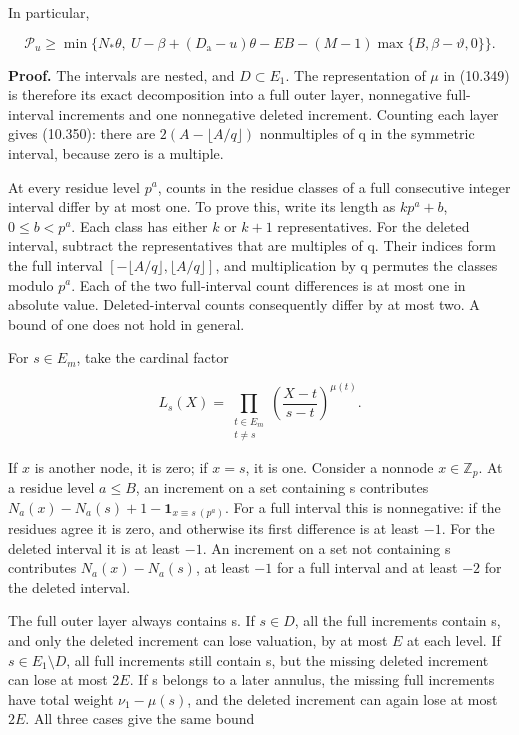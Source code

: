 \documentclass[
  11pt,
  a4paper,
]{article}
\begin{document}
In particular,

\[
\mathcal P_u\ge
\min\{N_*\theta,\ U-\beta+(D_{\mathrm a}-u)\theta
-EB-(M-1)\max\{B,\beta-\vartheta,0\}\}.
\tag{10.353}
\]

\textbf{Proof.} The intervals are nested, and \(D\subset E_1\). The
representation of \(\mu\) in (10.349) is therefore its exact
decomposition into a full outer layer, nonnegative full-interval
increments and one nonnegative deleted increment. Counting each layer
gives (10.350): there are \(2(A-\lfloor A/q\rfloor)\) nonmultiples of q
in the symmetric interval, because zero is a multiple.

At every residue level \(p^a\), counts in the residue classes of a full
consecutive integer interval differ by at most one. To prove this, write
its length as \(kp^a+b\), \(0\le b<p^a\). Each class has either \(k\) or
\(k+1\) representatives. For the deleted interval, subtract the
representatives that are multiples of q. Their indices form the full
interval \([-\lfloor A/q\rfloor,\lfloor A/q\rfloor]\), and
multiplication by q permutes the classes modulo \(p^a\). Each of the two
full-interval count differences is at most one in absolute value.
Deleted-interval counts consequently differ by at most two. A bound of
one does not hold in general.

For \(s\in E_m\), take the cardinal factor

\[
L_s(X)=\prod_{\substack{t\in E_m\\t\ne s}}
\left(\frac{X-t}{s-t}\right)^{\mu(t)}.
\]

If \(x\) is another node, it is zero; if \(x=s\), it is one. Consider a
nonnode \(x\in\mathbb Z_p\). At a residue level \(a\le B\), an increment
on a set containing s contributes
\(N_a(x)-N_a(s)+1-\mathbf1_{x\equiv s\ (p^a)}\). For a full interval
this is nonnegative: if the residues agree it is zero, and otherwise its
first difference is at least \(-1\). For the deleted interval it is at
least \(-1\). An increment on a set not containing s contributes
\(N_a(x)-N_a(s)\), at least \(-1\) for a full interval and at least
\(-2\) for the deleted interval.

The full outer layer always contains s. If \(s\in D\), all the full
increments contain s, and only the deleted increment can lose valuation,
by at most \(E\) at each level. If \(s\in E_1\setminus D\), all full
increments still contain s, but the missing deleted increment can lose
at most \(2E\). If s belongs to a later annulus, the missing full
increments have total weight \(\nu_1-\mu(s)\), and the deleted increment
can again lose at most \(2E\). All three cases give the same bound
\end{document}
